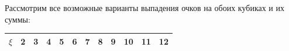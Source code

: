 Рассмотрим все возможные варианты выпадения очков на обоих кубиках и их суммы:
\begin{table}[H]
	\centering
	\begin{tabular}{|c|c|c|c|c|c|c|c|c|c|c|c|}
		\hline
		$\xi$ & 2     & 3                                                        & 4                                                                      & 5                                                                              & 6                                                                                         & 7                                                                                                    & 8                                                                                         & 9                                                                              & 10                                                                  & 11                                                       & 12    \\ \hline

\end{tabular}
\end{table}

